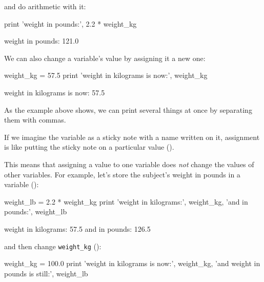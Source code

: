 and do arithmetic with it:

\begin{VerbIn}
print 'weight in pounds:', 2.2 * weight_kg
\end{VerbIn}

\begin{VerbOut}
weight in pounds: 121.0
\end{VerbOut}

We can also change a variable's value by assigning it a new one:

\begin{VerbIn}
weight_kg = 57.5
print 'weight in kilograms is now:', weight_kg
\end{VerbIn}

\begin{VerbOut}
weight in kilograms is now: 57.5
\end{VerbOut}

As the example above shows, we can print several things at once by
separating them with commas.

If we imagine the variable as a sticky note with a name written on it,
assignment is like putting the sticky note on a particular value ().


This means that assigning a value to one variable does \emph{not} change
the values of other variables. For example, let's store the subject's
weight in pounds in a variable ():

\begin{VerbIn}
weight_lb = 2.2 * weight_kg
print 'weight in kilograms:', weight_kg, 'and in pounds:', weight_lb
\end{VerbIn}

\begin{VerbOut}
weight in kilograms: 57.5 and in pounds: 126.5
\end{VerbOut}


and then change \texttt{weight\_kg} ():

\begin{VerbIn}
weight_kg = 100.0
print 'weight in kilograms is now:', weight_kg, 'and weight in pounds is still:', weight_lb
\end{VerbIn}

